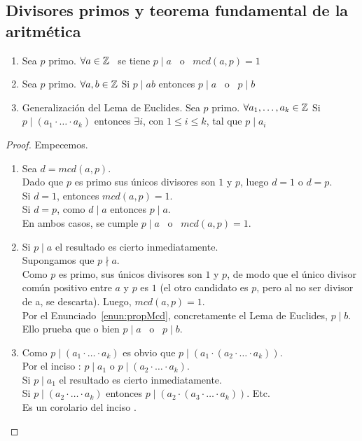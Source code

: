\subsection{Divisores primos y teorema fundamental de la aritmética}
\begin{enunciado}\label{enun:propDivprim}
\leavevmode\par
\begin{enumerate}[label=\roman*)]
\item Sea $p$ primo. $\forall a \in \mathbb{Z}$ \, se tiene $p \mid a$ \, o \, $mcd(a,p) = 1$ 
\item Sea $p$ primo. $\forall a,b \in \mathbb{Z}$ \; Si $p \mid ab$ entonces $p \mid a$  \, o  \, $p \mid b$
\item Generalización del Lema de Euclides. Sea $p$ primo. $\forall a_1, \ldots, a_k \in \mathbb{Z}$  \; Si $p \mid (a_1 \cdot \ldots \cdot a_k)$ entonces $\exists i$, con $1 \leq i \leq k$, tal que $p \mid a_i$
\end{enumerate}
\end{enunciado}

\begin{proof} Empecemos.
\begin{enumerate}[label=\roman*)]
\item Sea $d = mcd(a,p)$. \\
Dado que $p$ es primo sus únicos divisores son $1$ y $p$, luego $d = 1$ o $d = p$. \\
Si $d = 1$, entonces $mcd(a,p) = 1$. \\
Si $d = p$, como $d \mid a$ entonces $p \mid a$. \\
En ambos casos, se cumple $p \mid a$ \, o \, $mcd(a,p) = 1$. 
\item Si $p \mid a$ el resultado es cierto inmediatamente. \\
Supongamos que $p \nmid a$. \\
Como $p$ es primo, sus únicos divisores son $1$ y $p$, de modo que el único divisor común positivo entre $a$ y $p$ es $1$ (el otro candidato es $p$, pero al no ser divisor de a, se descarta). Luego, $mcd(a,p) = 1$. \\ 
Por el Enunciado~\ref{enun:propMcd}, concretamente el Lema de Euclides, $p \mid b$. \\
Ello prueba que o bien $p \mid a$ \, o \, $p \mid b$. 
\item Como $p \mid (a_1 \cdot \ldots \cdot a_k)$ es obvio que $p \mid (a_1 \cdot (a_2 \cdot \ldots \cdot a_k))$. \\
\setcounter{enumi}{2}
Por el inciso : $p \mid a_1$ o $p \mid (a_2 \cdot \ldots \cdot a_k)$. \\
Si $p \mid a_1$ el resultado es cierto inmediatamente. \\
Si $p \mid (a_2 \cdot \ldots \cdot a_k)$ entonces $p \mid (a_2 \cdot (a_3 \cdot \ldots \cdot a_k))$. Etc. \\
Es un corolario del inciso .
\end{enumerate}
\end{proof}

